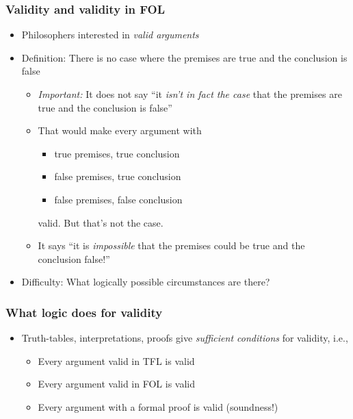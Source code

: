 \begin{frame}
    \frametitle{Validity and validity in FOL}

\begin{itemize}[<+->]
\item Philosophers interested in \emph{valid arguments}
\item Definition: There is no case where the
premises are true and the conclusion is false
\begin{itemize}[<+->]
\item \emph{Important:} It does not say ``it \emph{isn't in fact the case} that the premises
are true and the conclusion is false''
\item That would make every argument with
\begin{itemize}
\item true premises, true conclusion
\item false premises, true conclusion
\item false premises, false conclusion
\end{itemize}
valid.  But that's not the case.
\item It says ``it is \emph{impossible} that the premises could be true and the conclusion false!''
\end{itemize}
\item Difficulty: What logically possible circumstances are there?
\end{itemize}

\end{frame}

\begin{frame}
    \frametitle{What logic does for validity}

\begin{itemize}[<+->]
\item Truth-tables, interpretations, proofs give \emph{sufficient conditions}
for validity, i.e.,
\begin{itemize}
\item Every argument valid in TFL is valid
\item Every argument valid in FOL is valid
\item Every argument with a formal proof is valid (soundness!)
\end{itemize}
\end{itemize}

\end{frame}

